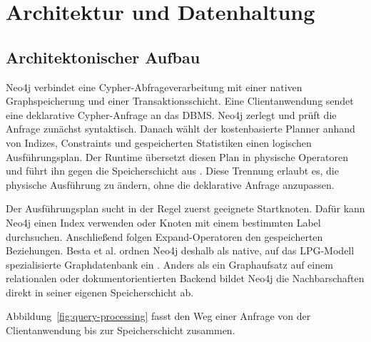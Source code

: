 
\chapter{Architektur und Datenhaltung}

\section{Architektonischer Aufbau}

Neo4j verbindet eine Cypher-Abfrageverarbeitung mit einer nativen Graphspeicherung und einer Transaktionsschicht. Eine Clientanwendung sendet eine deklarative Cypher-Anfrage an das \ac{DBMS}. Neo4j zerlegt und prüft die Anfrage zunächst syntaktisch. Danach wählt der kostenbasierte Planner anhand von Indizes, Constraints und gespeicherten Statistiken einen logischen Ausführungsplan. Der Runtime übersetzt diesen Plan in physische Operatoren und führt ihn gegen die Speicherschicht aus \cite{neo4j2026queryplans}. Diese Trennung erlaubt es, die physische Ausführung zu ändern, ohne die deklarative Anfrage anzupassen.

Der Ausführungsplan sucht in der Regel zuerst geeignete Startknoten. Dafür kann Neo4j einen Index verwenden oder Knoten mit einem bestimmten Label durchsuchen. Anschließend folgen Expand-Operatoren den gespeicherten Beziehungen. Besta et al. ordnen Neo4j deshalb als native, auf das \ac{LPG}-Modell spezialisierte Graphdatenbank ein \cite{besta2023demystifying}. Anders als ein Graphaufsatz auf einem relationalen oder dokumentorientierten Backend bildet Neo4j die Nachbarschaften direkt in seiner eigenen Speicherschicht ab.

Abbildung~\ref{fig:query-processing} fasst den Weg einer Anfrage von der Clientanwendung bis zur Speicherschicht zusammen.

